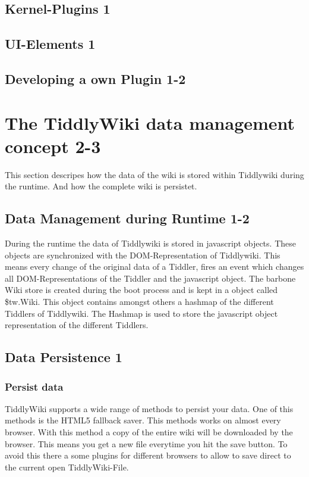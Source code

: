 \documentclass[12pt,a4paper]{article}
\begin{document}
\subsection{Kernel-Plugins 1}
\subsection{UI-Elements 1}
\subsection{Developing a own Plugin 1-2}
\newpage
\section{The TiddlyWiki data management concept 2-3}
This section descripes how the data of the wiki is stored within Tiddlywiki during the runtime. And how the complete wiki is persistet.
\subsection{Data Management during Runtime 1-2}
During the runtime the data of Tiddlywiki is stored in javascript objects. These objects are synchronized with the DOM-Representation of Tiddlywiki. This means every change of the original data of a Tiddler, fires an event which changes all DOM-Representations of the Tiddler and the javascript object. The barbone Wiki store is created during the boot process and is kept in a object called \$tw.Wiki. This object contains amongst others a hashmap of the different Tiddlers of Tiddlywiki. The Hashmap is used to store the javascript object representation of the different Tiddlers.
\newpage 
\subsection{Data Persistence 1}
\subsubsection*{Persist data}
TiddlyWiki supports a wide range of methods to persist your data. One of this methods is the HTML5 fallback saver. This methods works on almost every browser. With this method a copy of the entire wiki will be downloaded by the browser. This means you get a new file everytime you hit the save button. To avoid this there a some plugins for different browsers to allow to save direct to the current open TiddlyWiki-File.
\end{document}
